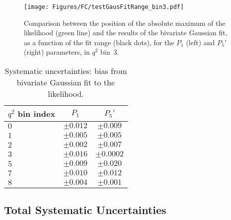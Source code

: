 \begin{figure}
  \centering
  \texttt{[image: Figures/FC/testGausFitRange\_bin3.pdf]}
  \caption{Comparison between the position of the absolute maximum of the likelihood (green line) and the results of the bivariate Gaussian fit, as a function of the fit range (black dots), for the $P_1$ (left) and $P_5'$ (right) parameters, in $q^2$ bin~3.
  }
  \label{fig:gausFitRange}
\end{figure}

\begin{table*}[!htb]
  \begin {center}
    \begin{small}
      \caption{Systematic uncertainties: bias from bivariate Gaussian fit to the likelihood.
        \label{tab:rangeGausFit}}
      \begin{tabular}{l|cc}
        \hline
        $q^2$ bin index   & $P_1$ & $P_5'$ \\
        \hline
        $ 0 $    &   $\pm0.012$ & $\pm0.009 $   \\
        $ 1 $    &   $\pm0.005$ & $\pm0.005 $   \\
        $ 2 $    &   $\pm0.002$ & $\pm0.007 $   \\
        $ 3 $    &   $\pm0.016$ & $\pm0.0002$   \\
        $ 5 $    &   $\pm0.009$ & $\pm0.020 $   \\
        $ 7 $    &   $\pm0.010$ & $\pm0.012 $   \\
        $ 8 $    &   $\pm0.004$ & $\pm0.001 $   \\
        \hline
      \end{tabular}
    \end{small}
  \end{center}
\end{table*}

\clearpage
\subsection{Total Systematic Uncertainties}
\label{sec:sys-total}

